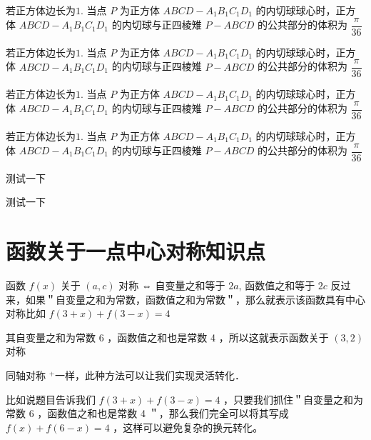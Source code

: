 \documentclass[lang=cn,12pt,fontset=none,a4paper]{beautybook}
\begin{document}
\begin{application}[正四棱锥与球的公共部分体积]\label{application:2}
   若正方体边长为$1$. 当点 $P$ 为正方体 $A B C D-A_1 B_1 C_1 D_1$ 的内切球球心时，正方体 $A B C D-A_1 B_1 C_1 D_1$ 的内切球与正四棱雉 $P-A B C D$ 的公共部分的体积为 $\dfrac{\pi}{36}$
\end{application}


\begin{RemarK}[正四棱锥与球的公共部分体积]\label{Remark:2}
   若正方体边长为$1$. 当点 $P$ 为正方体 $A B C D-A_1 B_1 C_1 D_1$ 的内切球球心时，正方体 $A B C D-A_1 B_1 C_1 D_1$ 的内切球与正四棱雉 $P-A B C D$ 的公共部分的体积为 $\dfrac{\pi}{36}$
\end{RemarK}


\begin{Example}[正四棱锥与球的公共部分体积]\label{Example:2}
   若正方体边长为$1$. 当点 $P$ 为正方体 $A B C D-A_1 B_1 C_1 D_1$ 的内切球球心时，正方体 $A B C D-A_1 B_1 C_1 D_1$ 的内切球与正四棱雉 $P-A B C D$ 的公共部分的体积为 $\dfrac{\pi}{36}$
\end{Example}

\begin{Problem}[正四棱锥与球的公共部分体积]\label{Problem:2}
   若正方体边长为$1$. 当点 $P$ 为正方体 $A B C D-A_1 B_1 C_1 D_1$ 的内切球球心时，正方体 $A B C D-A_1 B_1 C_1 D_1$ 的内切球与正四棱雉 $P-A B C D$ 的公共部分的体积为 $\dfrac{\pi}{36}$
\end{Problem}
\begin{Proof}
   测试一下
\end{Proof}

\begin{Solution}
   测试一下
\end{Solution}

\section{函数关于一点中心对称知识点}



函数 $f(x)$ 关于 $(a, c)$ 对称 ⇔ 自变量之和等于 $2 a$, 函数值之和等于 $2 c$
反过来，如果＂自变量之和为常数，函数值之和为常数＂，那么就表示该函数具有中心对称比如 $f(3+x)+f(3-x)=4$

其自变量之和为常数 6 ，函数值之和也是常数 4 ，所以这就表示函数关于 $(3,2)$ 对称

同轴对称 ${ }^{+}$一样，此种方法可以让我们实现灵活转化．

比如说题目告诉我们 $f(3+x)+f(3-x)=4$ ，只要我们抓住＂自变量之和为常数 6 ，函数值之和也是常数 4 ＂，那么我们完全可以将其写成 $f(x)+f(6-x)=4$ ，这样可以避免复杂的换元转化。
\end{document}

